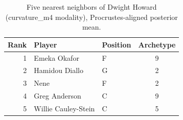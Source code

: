 \begin{table}[htbp]
  \centering\small
  \begin{tabular}{rllc}
    \toprule
    Rank & Player & Position & Archetype \\
    \midrule
    1 & Emeka Okafor & F & 9 \\
    2 & Hamidou Diallo & G & 2 \\
    3 & Nene & F & 2 \\
    4 & Greg Anderson & C & 9 \\
    5 & Willie Cauley-Stein & C & 5 \\
    \bottomrule
  \end{tabular}
  \caption{Five nearest neighbors of Dwight Howard (curvature_m4 modality), Procrustes-aligned posterior mean.}
  \label{tab:Dwight_Howard_neighbors_curvature_m4}
\end{table}


